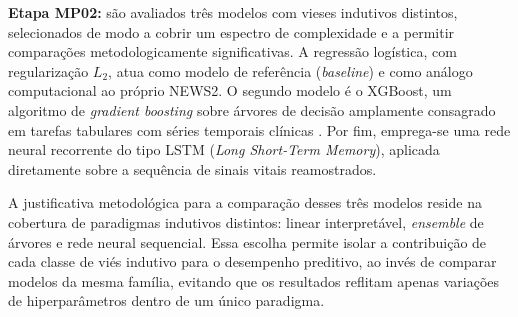 \textbf{Etapa MP02:} são avaliados três modelos com vieses indutivos distintos, selecionados de modo a cobrir um espectro de complexidade e a permitir comparações metodologicamente significativas. A regressão logística, com regularização $L_{2}$, atua como modelo de referência (\textit{baseline}) e como análogo computacional ao próprio NEWS2. O segundo modelo é o XGBoost, um algoritmo de \textit{gradient boosting} sobre árvores de decisão amplamente consagrado em tarefas tabulares com séries temporais clínicas \cite{churpek2016}. Por fim, emprega-se uma rede neural recorrente do tipo LSTM (\textit{Long Short-Term Memory}), aplicada diretamente sobre a sequência de sinais vitais reamostrados. %

A justificativa metodológica para a comparação desses três modelos reside na cobertura de paradigmas indutivos distintos: linear interpretável, \textit{ensemble} de árvores e rede neural sequencial. Essa escolha permite isolar a contribuição de cada classe de viés indutivo para o desempenho preditivo, ao invés de comparar modelos da mesma família, evitando que os resultados reflitam apenas variações de hiperparâmetros dentro de um único paradigma.
